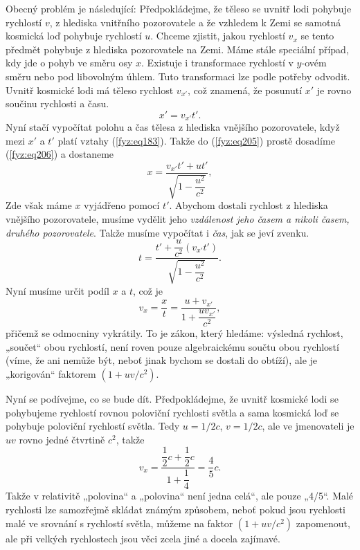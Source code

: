     Obecný problém je následující: Předpokládejme, že těleso se uvnitř lodi pohybuje rychlostí 
    \(v\), z hlediska vnitřního pozorovatele a že vzhledem k Zemi se samotná kosmická loď pohybuje 
    rychlostí \(u\). Chceme zjistit, jakou rychlostí \(v_x\) se tento předmět pohybuje z hlediska 
    pozorovatele na Zemi. Máme stále speciální případ, kdy jde o pohyb ve směru osy \(x\). Existuje 
    i transformace rychlostí v \(y\)-ovém směru nebo pod libovolným úhlem. Tuto transformaci lze 
    podle potřeby odvodit. Uvnitř kosmické lodi má těleso rychlost \(v_{x'}\), což znamená, že 
    posunutí \(x'\) je rovno součinu rychlosti a času.
    \begin{equation}\label{fyz:eq206}
      x' = v_{x'}t'. 
    \end{equation}
    Nyní stačí vypočítat polohu a čas tělesa z hlediska vnějšího pozorovatele, když mezi \(x'\) a 
    \(t'\) platí vztahy (\ref{fyz:eq183}). Takže do (\ref{fyz:eq205}) prostě dosadíme 
    (\ref{fyz:eq206}) a dostaneme
    \begin{equation}\label{fyz:eq207}
      x = \frac{v_{x'}t' + ut'}{\sqrt{1-\dfrac{u^2}{c^2}}},
    \end{equation}
    Zde však máme \(x\) vyjádřeno pomocí \(t'\). Abychom dostali rychlost z hlediska vnějšího 
    pozorovatele, musíme vydělit jeho \emph{vzdálenost jeho časem a nikoli časem, druhého 
    pozorovatele}. Takže musíme vypočítat i \emph{čas}, jak se jeví zvenku.
    \begin{equation}\label{fyz:eq208}
      t = \frac{t'+\dfrac{u}{c^2}(v_{x'}t')}{\sqrt{1-\dfrac{u^2}{c^2}}}. 
    \end{equation}
    Nyní musíme určit podíl \(x\) a \(t\), což je
    \begin{equation}\label{fyz:eq209}
      v_x = \frac{x}{t} = \frac{u+v_{x'}}{1+\dfrac{uv_{x'}}{c^2}},
    \end{equation}
    přičemž se odmocniny vykrátily. To je zákon, který hledáme: výsledná rychlost, „součet“ obou 
    rychlostí, není roven pouze algebraickému součtu obou rychlostí (víme, že ani nemůže být, neboť 
    jinak bychom se dostali do obtíží), ale je „korigován“ faktorem \((1 + uv/c^2)\).
    
    Nyní se podívejme, co se bude dít. Předpokládejme, že uvnitř kosmické lodi se pohybujeme 
    rychlostí rovnou poloviční rychlosti světla a sama kosmická loď se pohybuje poloviční rychlostí 
    světla. Tedy \(u= 1/2c\), \(v= 1/2c\), ale ve jmenovateli je \(uv\) rovno jedné čtvrtině 
    \(c^2\), takže
    \begin{equation*}
      v_x = \frac{\dfrac{1}{2}c + \dfrac{1}{2}c}{1+\dfrac{1}{4}} = \dfrac{4}{5}c.
    \end{equation*}
    Takže v relativitě „polovina“ a „polovina“ není jedna celá“, ale pouze „\num{4/5}“. Malé 
    rychlosti lze samozřejmě skládat známým způsobem, neboť pokud jsou rychlosti malé ve srovnání s 
    rychlostí světla, můžeme na faktor \((1 + uv/c^2)\) zapomenout, ale při velkých rychlostech 
    jsou věci zcela jiné a docela zajímavé.
    
